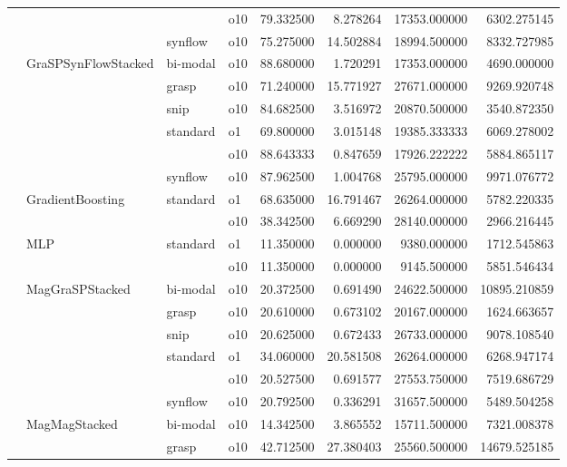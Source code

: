 \begin{longtable}{llllrrrr}
      &     &         & o10 &  79.332500 &   8.278264 &     17353.000000 &   6302.275145 \\
      &     & synflow & o10 &  75.275000 &  14.502884 &     18994.500000 &   8332.727985 \\
      & GraSPSynFlowStacked & bi-modal & o10 &  88.680000 &   1.720291 &     17353.000000 &   4690.000000 \\
      &     & grasp & o10 &  71.240000 &  15.771927 &     27671.000000 &   9269.920748 \\
      &     & snip & o10 &  84.682500 &   3.516972 &     20870.500000 &   3540.872350 \\
      &     & standard & o1 &  69.800000 &   3.015148 &     19385.333333 &   6069.278002 \\
      &     &         & o10 &  88.643333 &   0.847659 &     17926.222222 &   5884.865117 \\
      &     & synflow & o10 &  87.962500 &   1.004768 &     25795.000000 &   9971.076772 \\
      & GradientBoosting & standard & o1 &  68.635000 &  16.791467 &     26264.000000 &   5782.220335 \\
      &     &         & o10 &  38.342500 &   6.669290 &     28140.000000 &   2966.216445 \\
      & MLP & standard & o1 &  11.350000 &   0.000000 &      9380.000000 &   1712.545863 \\
      &     &         & o10 &  11.350000 &   0.000000 &      9145.500000 &   5851.546434 \\
      & MagGraSPStacked & bi-modal & o10 &  20.372500 &   0.691490 &     24622.500000 &  10895.210859 \\
      &     & grasp & o10 &  20.610000 &   0.673102 &     20167.000000 &   1624.663657 \\
      &     & snip & o10 &  20.625000 &   0.672433 &     26733.000000 &   9078.108540 \\
      &     & standard & o1 &  34.060000 &  20.581508 &     26264.000000 &   6268.947174 \\
      &     &         & o10 &  20.527500 &   0.691577 &     27553.750000 &   7519.686729 \\
      &     & synflow & o10 &  20.792500 &   0.336291 &     31657.500000 &   5489.504258 \\
      & MagMagStacked & bi-modal & o10 &  14.342500 &   3.865552 &     15711.500000 &   7321.008378 \\
      &     & grasp & o10 &  42.712500 &  27.380403 &     25560.500000 &  14679.525185 \\

\end{longtable}
